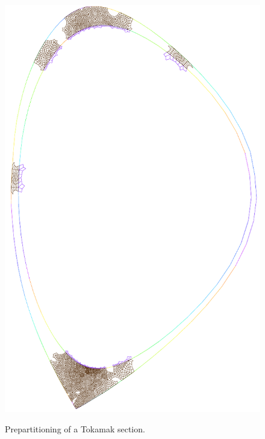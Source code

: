 \begin{figure}
{\includegraphics[scale=.5]{images/tokamak_layer_mesh_adapt_fine_3_pre.pdf}}\quad
\caption{Prepartitioning of a Tokamak section.}\label{fig:prepartitioning}
\end{figure}

